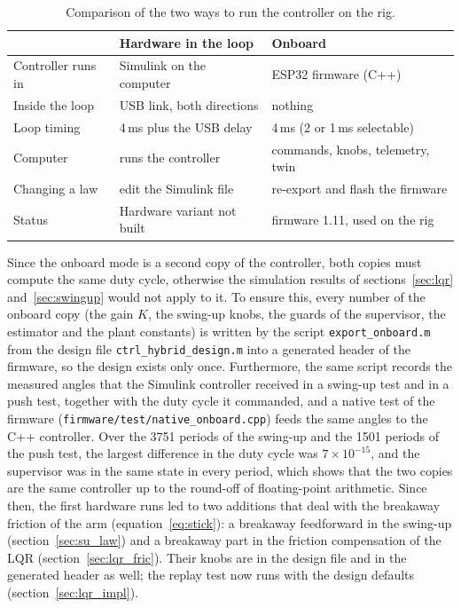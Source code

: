 \documentclass[a4paper,11pt]{article}
\begin{document}
\begin{table}[h]
\centering
\caption{Comparison of the two ways to run the controller on the rig.}
\label{tab:modes}
\small
\begin{tabular}{@{}lll@{}}
\toprule
 & Hardware in the loop & Onboard \\
\midrule
Controller runs in & Simulink on the computer & ESP32 firmware (C++) \\
Inside the loop & USB link, both directions & nothing \\
Loop timing & 4\,ms plus the USB delay & 4\,ms (2 or 1\,ms selectable) \\
Computer & runs the controller & commands, knobs, telemetry, twin \\
Changing a law & edit the Simulink file & re-export and flash the firmware \\
Status & Hardware variant not built & firmware 1.11, used on the rig \\
\bottomrule
\end{tabular}
\end{table}

Since the onboard mode is a second copy of the controller, both copies must compute the same duty cycle, otherwise the simulation results of sections~\ref{sec:lqr} and~\ref{sec:swingup} would not apply to it. To ensure this, every number of the onboard copy (the gain $K$, the swing-up knobs, the guards of the supervisor, the estimator and the plant constants) is written by the script \texttt{export\_onboard.m} from the design file \texttt{ctrl\_hybrid\_design.m} into a generated header of the firmware, so the design exists only once. Furthermore, the same script records the measured angles that the Simulink controller received in a swing-up test and in a push test, together with the duty cycle it commanded, and a native test of the firmware (\nolinkurl{firmware/test/native_onboard.cpp}) feeds the same angles to the C++ controller. Over the 3751 periods of the swing-up and the 1501 periods of the push test, the largest difference in the duty cycle was $7\times10^{-15}$, and the supervisor was in the same state in every period, which shows that the two copies are the same controller up to the round-off of floating-point arithmetic. Since then, the first hardware runs led to two additions that deal with the breakaway friction of the arm (equation~\ref{eq:stick}): a breakaway feedforward in the swing-up (section~\ref{sec:su_law}) and a breakaway part in the friction compensation of the LQR (section~\ref{sec:lqr_fric}). Their knobs are in the design file and in the generated header as well; the replay test now runs with the design defaults (section~\ref{sec:lqr_impl}).
\end{document}
